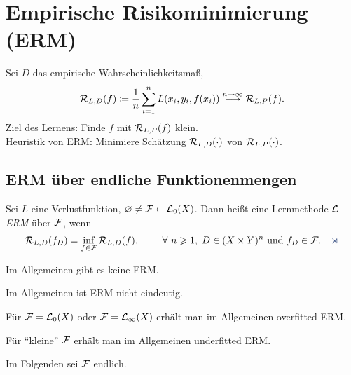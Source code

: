 \chapter{Empirische Risikominimierung (ERM)}

\begin{bem*}[Motivation.]
Sei $D$ das empirische Wahrscheinlichkeitsmaß,
\begin{align*}
\mathcal{R}_{L,D}(f) \coloneq \frac{1}{n}\sum_{i=1}^n L(x_i,y_i,f(x_i))
\overset{n\to\infty}{\longrightarrow} \mathcal{R}_{L,P}(f).
\end{align*}
Ziel des Lernens: Finde $f$ mit $\mathcal{R}_{L,P}(f)$ klein.\\
Heuristik von ERM: Minimiere Schätzung $\mathcal{R}_{L,D}(\cdot)$ von
$\mathcal{R}_{L,P}(\cdot)$.\maphere
\end{bem*}

\section{ERM über endliche Funktionenmengen}

\begin{defn}
\label{defn:4.1.1}
Sei $L$ eine Verlustfunktion, $\varnothing\neq \mathcal{F}\subset \mathcal{L}_0(X)$. Dann heißt
eine Lernmethode $\mathcal{L}$ \emph{ERM} über $\mathcal{F}$, wenn
\begin{align*}
\RR_{L,D}(f_D) = \inf_{f\in\FF} \RR_{L,D}(f),\qquad \forall n\ge 1,\; D\in
(X\times Y)^n \text{ und } f_D\in\FF.\fishhere
\end{align*}
\end{defn}

\begin{bem*}[Bemerkungen.]
\begin{bemenum}
\item Im Allgemeinen gibt es keine ERM.
\item Im Allgemeinen ist ERM nicht eindeutig.
\item Für $\mathcal{F}=\mathcal{L}_0(X)$ oder $\mathcal{F}=\mathcal{L}_\infty(X)$ erhält man im Allgemeinen
overfitted ERM.
\item Für "`kleine"' $\mathcal{F}$ erhält man im Allgemeinen underfitted ERM.
\end{bemenum}
\end{bem*}

Im Folgenden sei $\mathcal{F}$ endlich.

